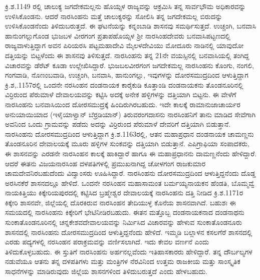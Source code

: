 ಕ್ರಿ.ಶ.1149 ರಲ್ಲಿ ಚಾಲುಕ್ಯ ಜಗದೇಕಮಲ್ಲನು ಹೊಯ್ಸಳ ರಾಜ್ಯವನ್ನು ಆಕ್ರಮಿಸಿ ತನ್ನ ಸಾರ್ವಭೌಮ ಅಧಿಕಾರವನ್ನು ಉಳಿಸಿಕೊಂಡನು. ಆದರೆ ನಾರಸಿಂಹನು ಮತ್ತೆ ಚಾಲುಕ್ಯರನ್ನು ಸೋಲಿಸಿ ತನ್ನ ಜಗದೇಕಮಲ್ಲ ಬಿರುದನ್ನು ಉಳಿಸಿಕೊಂಡನೆಂದು ತಿಳಿದುಬರುತ್ತದೆ. ಈ ಘಟನೆಯನ್ನು ಕನ್ನಂಬಾಡಿ ಶಾಸನವು ಸಮರ್ಥಿಸುತ್ತದೆ. ಉಚ್ಚಂಗಿ, ಬನವಾಸಿ ಹಾನುಂಗಲ್ಲುಗೊಂಡ ಭುಜಬಳ ವೀರಗಂಗ ಪ್ರತಾಪಹೊಯ್ಸಳ ಶ‍್ರೀ ನಾರಸಿಂಹದೇವರು ಬನವಾಸಿಪಟ್ಟಣದಲ್ಲಿ ರಾಜ್ಯವಾಳುತ್ತಿದ್ದಾಗ ಅವನ ಪಿರಿಯರಸಿ ಪಟ್ಟಮಹಾದೇವಿ ಮೈಲಳದೇವಿಯು ಮೋದೂರು ನಾಡಿನಲ್ಲಿ ಯಾವುದೋ ದತ್ತಿಯನ್ನು ಬಿಟ್ಟಳೆಂದು ಈ ಶಾಸನವು ತಿಳಿಸುತ್ತದೆ. ನಾರಸಿಂಹನು ತನ್ನ 21ನೇ ವಯಸ್ಸಿನಲ್ಲಿ ಬನವಾಸಿಯಲ್ಲಿ ತಂಗಿದ್ದ ವಿಚಾರವನ್ನು ಡೆರೆಟ್​ ಕೂಡಾ ಉಲ್ಲೇಖಿಸಿದ್ದಾರೆ. ಭುಜಬಲವೀರಗಂಗ ಜಗದೇಕಮಲ್ಲ ನಾರಸಿಂಹನು ಕೊಂಗು, ನಂಗಲಿ, ಗಂಗವಾಡಿ, ನೊಣಂಬವಾಡಿ, ಉಚ್ಚಂಗಿ, ಬನವಾಸಿ, ಹಾನುಂಗಲ್ಲು, ಇವುಗಳನ್ನು ದೋರಸಮುದ್ರದಿಂದ ಆಳುತ್ತಿದ್ದಾಗ ಕ್ರಿ.ಶ,.1157ರಲ್ಲಿ ಒಂದನೇ ನರಸಿಂಹನ ದಂಡನಾಯಕ ಕಾರೈಕುಡಿ ಕೂತ್ತಾಂಡಿ ದಂಡನಾಯಕನು ತೊಂಡನೂರಿನಲ್ಲಿ ವಿರ್ರಿರುಂದ ಪೆರುಮಾಳೆ ದೇವಾಲಯವನ್ನು ಕಟ್ಟಿಸಿ ಅದಕ್ಕೆ ಅನೇಕ ಹಳ್ಳಿಗಳನ್ನು ದತ್ತಿಯಾಗಿ ಬಿಟ್ಟನು. ಈ ವೇಳೆಗೆ ನಾರಸಿಂಹನು ಬನವಾಸಿಯಿಂದ ದೋರಸಮುದ್ರಕ್ಕೆ ಹಿಂದಿರುಗಿರಬಹುದು. ಇದೇ ಕಾಲಕ್ಕೆ ರಾಮಾನುಜಾಚಾರ್ಯರ ಅನುಯಾಯಿಯಾದ (ಇಳೈಯಾಳ್ವಾನ್​ ಬೆರ್ರಡಿಯಾನ್​) ತಿರುವರಂಗದಾಸನು ನಾರಸಿಂಹನಿಗೆ ತಾನು ಮಾಡಿದ ಸೇವೆಗಾಗಿ ಅವನಿಂದ ಒಂದು ಗ್ರಾಮವನ್ನು ಪಡೆದು ಅದನ್ನು ವಿರ್ರಿರುಂದ ಪೆರುಮಾಳೆ ದೇವರಿಗೆ ದತ್ತಿಯಾಗಿ ಬಿಡುತ್ತಾನೆ. ನಾರಸಿಂಹನು ದೋರಸಮುದ್ರದಿಂದ ಆಳುತ್ತಿದ್ದಾಗ ಕ್ರಿ.ಶ.1163ರಲ್ಲಿ, ಆತನ ಮಹಾಪ್ರಧಾನ ದಂಡನಾಯಕ ಚಾಮಣ್ಣನು ತೊಂಡನೂರಿನ ದೇವಾಲಯಕ್ಕೆ ಮೂರು ಹಳ್ಳಿಗಳ ಸುಂಕವನ್ನು ದತ್ತಿಯಾಗಿ ಬಿಡುತ್ತಾನೆ. ಎಪಿಗ್ರಾಫಿಯಾ ಸಂಪಾದಕರು, ಈ ಶಾಸನವನ್ನು ಎರಡನೇ ನಾರಸಿಂಹನ ಕಾಲಕ್ಕೆ ಹಾಕಿದ್ದಾರೆ ಹಾಗೂ ಈ ಮಹಾಪ್ರಧಾನನು ದಾಮಣ್ಣನೆಂದು ಹೇಳಿದ್ದಾರೆ. ಆದರೆ ಈತನು ವಿಜಯನಾರಸಿಂಹ ದಳಪತಿಗಳಲ್ಲಿ ಪ್ರಮುಖನಾಗಿದ್ದ ಚೋಳಗಂಗ ರಾಜಕುಮಾರ ಚಾಮದೇವನಿರಬಹುದೆಂದು ವಿದ್ವಾಂಸರು ಊಹಿಸಿದ್ದಾರೆ. ನಾರಸಿಂಹನು ದೋರಸಮುದ್ರದಿಂದ ಆಳುತ್ತಿದ್ದನೆಂದು ದೊಡ್ಡ ಅರಸಿನಕೆರೆ ಶಾಸನದಲ್ಲೂ ಹೇಳಿದೆ. ಒಂದನೇ ನರಸಿಂಹನ ಮಹಾಸಾಮಂತ ಬರ್ಮಯ್ಯನಾಯಕನ ಹೆಂಡತಿ, ಬೊಮ್ಮವ್ವೆ ನಾಯಕಿತ್ತಿಯು ಕಿಕ್ಕೇರಿಯಪುರದಲ್ಲಿ ಕಟ್ಟಿಸಿದ ಬ್ರಹ್ಮೇಶ್ವರ ದೇವಾಲಯಕ್ಕೆ ನಾರಸಿಂಹನು ದತ್ತಿ ನೀಡಿದ ಕ್ರಿ.ಶ.1171ರ ಕಿಕ್ಕೇರಿ ಶಾಸನವೇ, ಜಿಲ್ಲೆಯಲ್ಲಿ ದೊರಕಿರುವ ನಾರಸಿಂಹನ ತೇದಿಯುಳ್ಳ ಕೊನೆಯ ಶಾಸನವಾಗಿದೆ. ಬಹುಶಃ ಈ ಸಮಯದಲ್ಲಿ ನಾರಸಿಂಹನು ಕಿಕ್ಕೇರಿಗೆ ಭೇಟಿನೀಡಿರಬಹುದು. ಈತನ ಮತ್ತೊಬ್ಬ ದಂಡನಾಯಕನಾದ ದಂಡನಾಥನು ಸುಂಕಾತೊಂಡನೂರಿನಲ್ಲಿ ಚನ್ನಕೇಶವದೇವಾಲಯವನ್ನು ನಿರ್ಮಿಸಿದ ವಿಚಾರವನ್ನು ಹೇಳುವ ಸುಂಕಾತೊಂಡನೂರು ಶಾಸನದಲ್ಲಿ ನಾರಸಿಂಹನು ದೋರಸಮುದ್ರದಿಂದ ಆಳುತ್ತಿದ್ದನೆಂದು ಹೇಳಿದೆ. ಇಮ್ಮಡಿ ಬಲ್ಲಾಳನ ಕಸಲಗೆರೆ ಶಾಸನದಲ್ಲಿ ಎರಡು ಪದ್ಯಗಳಲ್ಲಿ ನರಸಿಂಹನ ಪರಾಕ್ರಮವನ್ನು ವರ್ಣಿಸಲಾಗಿದೆ. ಇದು ಕೇವಲ ವರ್ಣನೆ ಎಂದು ತಿಳಿದುಕೊಳ್ಳಬಹುದು. ಈ ಸ್ತುತಿಗೆ ನಾರಸಿಂಹನು ಅರ್ಹನಲ್ಲವೆಂದು ಇತಿಹಾಸಕಾರರು ಹೇಳಿದ್ದಾರೆ. ತನ್ನ ದೌರ್ಬಲ್ಯಗಳ ನಡುವೆಯೂ ಆತನು ತನ್ನ ದಳಪತಿಗಳು ಮತ್ತು ಮಂತ್ರಿಗಳ ನೆರವಿನಿಂದ ಉತ್ತಮ ರಾಜಕೀಯ ಮತ್ತು ಸಾಂಸ್ಕೃತಿಕ ಸಾಧನೆಗಳನ್ನು ಮಾಡಿರುವುದು ಜಿಲ್ಲೆಯ ಶಾಸನಗಳಿಂದ ತಿಳಿದುಬರುತ್ತದೆ ಎಂದು ಹೇಳಬಹುದು. 

